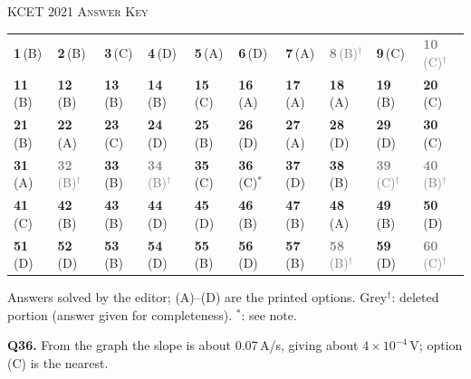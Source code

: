 \par{}\vspace{14pt}
\begin{center}{}\par
{\large\color{navy}\scshape KCET 2021 \textperiodcentered{} Answer Key}\end{center}
{\small\setlength{\tabcolsep}{1pt}\renewcommand{\arraystretch}{1.5}
\begin{tabularx}{\linewidth}{@{}*{10}{>{\centering\arraybackslash}X}@{}}\toprule
\textbf{1}\,(B) & \textbf{2}\,(B) & \textbf{3}\,(C) & \textbf{4}\,(D) & \textbf{5}\,(A) & \textbf{6}\,(D) & \textbf{7}\,(A) & \textcolor{gray}{\textbf{8}\,(B)$^{\dagger}$} & \textbf{9}\,(C) & \textcolor{gray}{\textbf{10}\,(C)$^{\dagger}$}\\
\textbf{11}\,(B) & \textbf{12}\,(B) & \textbf{13}\,(B) & \textbf{14}\,(B) & \textbf{15}\,(C) & \textbf{16}\,(A) & \textbf{17}\,(A) & \textbf{18}\,(A) & \textbf{19}\,(B) & \textbf{20}\,(C)\\
\textbf{21}\,(B) & \textbf{22}\,(A) & \textbf{23}\,(C) & \textbf{24}\,(D) & \textbf{25}\,(B) & \textbf{26}\,(D) & \textbf{27}\,(A) & \textbf{28}\,(D) & \textbf{29}\,(D) & \textbf{30}\,(C)\\
\textbf{31}\,(A) & \textcolor{gray}{\textbf{32}\,(B)$^{\dagger}$} & \textbf{33}\,(B) & \textcolor{gray}{\textbf{34}\,(B)$^{\dagger}$} & \textbf{35}\,(C) & \textbf{36}\,(C)$^{*}$ & \textbf{37}\,(D) & \textbf{38}\,(B) & \textcolor{gray}{\textbf{39}\,(C)$^{\dagger}$} & \textcolor{gray}{\textbf{40}\,(B)$^{\dagger}$}\\
\textbf{41}\,(C) & \textbf{42}\,(B) & \textbf{43}\,(B) & \textbf{44}\,(D) & \textbf{45}\,(D) & \textbf{46}\,(B) & \textbf{47}\,(B) & \textbf{48}\,(A) & \textbf{49}\,(B) & \textbf{50}\,(D)\\
\textbf{51}\,(D) & \textbf{52}\,(D) & \textbf{53}\,(B) & \textbf{54}\,(D) & \textbf{55}\,(B) & \textbf{56}\,(D) & \textbf{57}\,(B) & \textcolor{gray}{\textbf{58}\,(B)$^{\dagger}$} & \textbf{59}\,(D) & \textcolor{gray}{\textbf{60}\,(C)$^{\dagger}$}\\\bottomrule\end{tabularx}}\par\smallskip
{\footnotesize Answers solved by the editor; (A)--(D) are the printed options. {\color{gray}Grey$^{\dagger}$}: deleted portion (answer given for completeness). $^{*}$: see note.\par
\par\smallskip\textbf{Q36.} From the graph the slope is about 0.07\,A/s, giving about $4\times10^{-4}$\,V; option (C) is the nearest.
}\par
